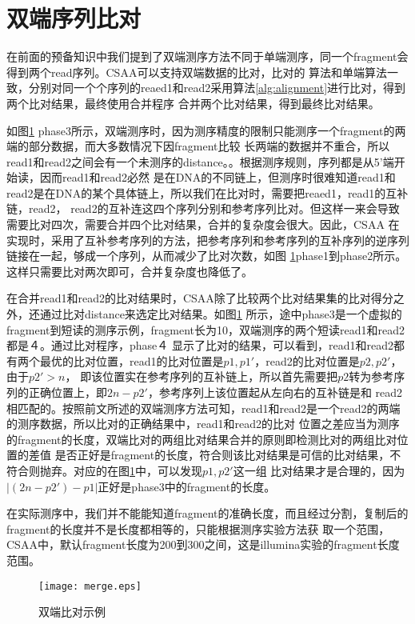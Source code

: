 \section{双端序列比对}
在前面的预备知识中我们提到了双端测序方法不同于单端测序，同一个fragment会得到两个read序列。CSAA可以支持双端数据的比对，比对的
算法和单端算法一致，分别对同一个个序列的reaed1和read2采用算法\ref{alg:alignment}进行比对，得到两个比对结果，最终使用合并程序
合并两个比对结果，得到最终比对结果。

如图\ref{fig:merge} phase3所示，双端测序时，因为测序精度的限制只能测序一个fragment的两端的部分数据，而大多数情况下因fragment比较
长两端的数据并不重合，所以read1和read2之间会有一个未测序的distance。。根据测序规则，序列都是从5'端开始读，因而read1和read2必然
是在DNA的不同链上，但测序时很难知道read1和read2是在DNA的某个具体链上，所以我们在比对时，需要把reaed1，read1的互补链，read2，
read2的互补连这四个序列分别和参考序列比对。但这样一来会导致需要比对四次，需要合并四个比对结果，合并的复杂度会很大。因此，CSAA
在实现时，采用了互补参考序列的方法，把参考序列和参考序列的互补序列的逆序列链接在一起，够成一个序列，从而减少了比对次数，如图
\ref{fig:merge}phase1到phase2所示。这样只需要比对两次即可，合并复杂度也降低了。

在合并read1和read2的比对结果时，CSAA除了比较两个比对结果集的比对得分之外，还通过比对distance来选定比对结果。如图\ref{fig:merge}
所示，途中phase3是一个虚拟的fragment到短读的测序示例，fragment长为10，双端测序的两个短读read1和read2都是４。通过比对程序，phase４
显示了比对的结果，可以看到，read1和read2都有两个最优的比对位置，read1的比对位置是$p1,p1'$，read2的比对位置是$p2,p2'$，由于$p2'>n$，
即该位置实在参考序列的互补链上，所以首先需要把$p2$转为参考序列的正确位置上，即$2n-p2'$，参考序列上该位置起从左向右的互补链是和
read2相匹配的。按照前文所述的双端测序方法可知，read1和read2是一个read2的两端的测序数据，所以比对的正确结果中，read1和read2的比对
位置之差应当为测序的fragment的长度，双端比对的两组比对结果合并的原则即检测比对的两组比对位置的差值
是否正好是fragment的长度，符合则该比对结果是可信的比对结果，不符合则抛弃。对应的在图\ref{fig:merge}中，可以发现$p1,p2'$这一组
比对结果才是合理的，因为$|(2n-p2')-p1|$正好是phase3中的fragment的长度。

在实际测序中，我们并不能能知道fragment的准确长度，而且经过分割，复制后的fragment的长度并不是长度都相等的，只能根据测序实验方法获
取一个范围，CSAA中，默认fragment长度为200到300之间，这是illumina实验的fragment长度范围。

\begin{figure}[htbp]
    \centering
    \texttt{[image: merge.eps]}
    \caption{双端比对示例} \label{fig:merge}
\end{figure}

